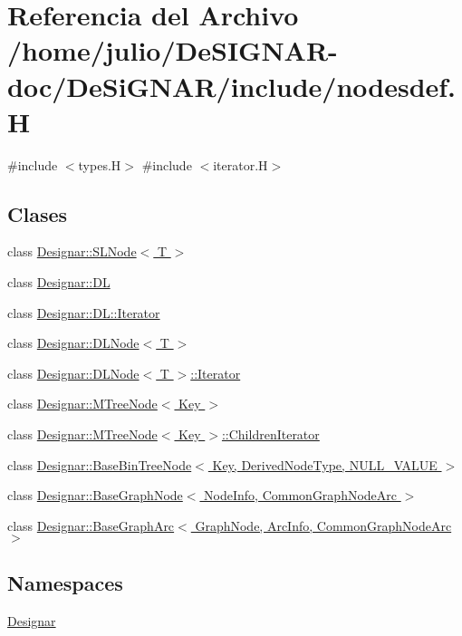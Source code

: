\hypertarget{nodesdef_8_h}{}\section{Referencia del Archivo /home/julio/\+De\+S\+I\+G\+N\+A\+R-\/doc/\+De\+Si\+G\+N\+A\+R/include/nodesdef.H}
\label{nodesdef_8_h}
{\ttfamily \#include $<$types.\+H$>$}\newline
{\ttfamily \#include $<$iterator.\+H$>$}\newline
\subsection*{Clases}
\begin{DoxyCompactItemize}
\item 
class \hyperlink{class_designar_1_1_s_l_node}{Designar\+::\+S\+L\+Node$<$ T $>$}
\item 
class \hyperlink{class_designar_1_1_d_l}{Designar\+::\+DL}
\item 
class \hyperlink{class_designar_1_1_d_l_1_1_iterator}{Designar\+::\+D\+L\+::\+Iterator}
\item 
class \hyperlink{class_designar_1_1_d_l_node}{Designar\+::\+D\+L\+Node$<$ T $>$}
\item 
class \hyperlink{class_designar_1_1_d_l_node_1_1_iterator}{Designar\+::\+D\+L\+Node$<$ T $>$\+::\+Iterator}
\item 
class \hyperlink{class_designar_1_1_m_tree_node}{Designar\+::\+M\+Tree\+Node$<$ Key $>$}
\item 
class \hyperlink{class_designar_1_1_m_tree_node_1_1_children_iterator}{Designar\+::\+M\+Tree\+Node$<$ Key $>$\+::\+Children\+Iterator}
\item 
class \hyperlink{class_designar_1_1_base_bin_tree_node}{Designar\+::\+Base\+Bin\+Tree\+Node$<$ Key, Derived\+Node\+Type, N\+U\+L\+L\+\_\+\+V\+A\+L\+U\+E $>$}
\item 
class \hyperlink{class_designar_1_1_base_graph_node}{Designar\+::\+Base\+Graph\+Node$<$ Node\+Info, Common\+Graph\+Node\+Arc $>$}
\item 
class \hyperlink{class_designar_1_1_base_graph_arc}{Designar\+::\+Base\+Graph\+Arc$<$ Graph\+Node, Arc\+Info, Common\+Graph\+Node\+Arc $>$}
\end{DoxyCompactItemize}
\subsection*{Namespaces}
\begin{DoxyCompactItemize}
\item 
 \hyperlink{namespace_designar}{Designar}
\end{DoxyCompactItemize}
